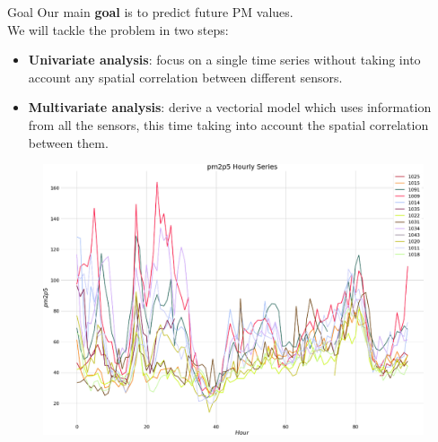 \documentclass[10pt]{beamer}
\theoremstyle{remark}
\theoremstyle{definition}
\begin{document}
\begin{frame}{Goal}
Our main \textbf{goal} is to predict future PM values. \\
We will tackle the problem in two steps:
    \begin{itemize}
        \item \textbf{Univariate analysis}: focus on a single time series without taking into account any spatial correlation between different sensors.
        \item \textbf{Multivariate analysis}: derive a vectorial model which uses information from all the sensors, this time taking into account the spatial correlation between them.
    \end{itemize}
    \begin{figure}[h]
        \centering
        \includegraphics[scale=0.15]{plotDati.png}
    \end{figure}
\end{frame}
\end{document}
